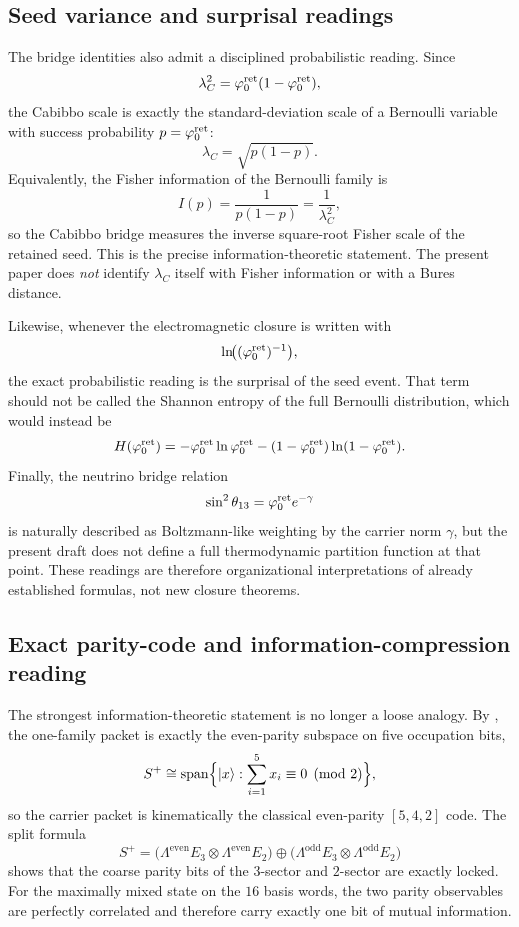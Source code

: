 \subsection{Seed variance and surprisal readings}

The bridge identities also admit a disciplined probabilistic reading. Since
\[
\lambda_C^2=\varphi_0^{\mathrm{ret}}(1-\varphi_0^{\mathrm{ret}}),
\]
the Cabibbo scale is exactly the standard-deviation scale of a Bernoulli variable with success probability $p=\varphi_0^{\mathrm{ret}}$:
\[
\lambda_C=\sqrt{p(1-p)}.
\]
Equivalently, the Fisher information of the Bernoulli family is
\[
I(p)=\frac{1}{p(1-p)}=\frac{1}{\lambda_C^2},
\]
so the Cabibbo bridge measures the inverse square-root Fisher scale of the retained seed. This is the precise information-theoretic statement. The present paper does \emph{not} identify $\lambda_C$ itself with Fisher information or with a Bures distance.

Likewise, whenever the electromagnetic closure is written with
\[
\ln\!\bigl((\varphi_0^{\mathrm{ret}})^{-1}\bigr),
\]
the exact probabilistic reading is the surprisal of the seed event. That term should not be called the Shannon entropy of the full Bernoulli distribution, which would instead be
\[
H(\varphi_0^{\mathrm{ret}})
=
-\varphi_0^{\mathrm{ret}}\ln\varphi_0^{\mathrm{ret}}-(1-\varphi_0^{\mathrm{ret}})\ln(1-\varphi_0^{\mathrm{ret}}).
\]
Finally, the neutrino bridge relation
\[
\sin^2\theta_{13}=\varphi_0^{\mathrm{ret}} e^{-\gamma}
\]
is naturally described as Boltzmann-like weighting by the carrier norm $\gamma$, but the present draft does not define a full thermodynamic partition function at that point. These readings are therefore organizational interpretations of already established formulas, not new closure theorems.

\subsection{Exact parity-code and information-compression reading}

The strongest information-theoretic statement is no longer a loose analogy. By , the one-family packet is exactly the even-parity subspace on five occupation bits,
\[
S^+
\cong
\mathrm{span}\Bigl\{|x\rangle:\sum_{i=1}^5 x_i\equiv 0 \pmod 2\Bigr\},
\]
so the carrier packet is kinematically the classical even-parity $[5,4,2]$ code. The split formula
\[
S^+
=
\bigl(\Lambda^{\mathrm{even}}E_3\otimes\Lambda^{\mathrm{even}}E_2\bigr)
\oplus
\bigl(\Lambda^{\mathrm{odd}}E_3\otimes\Lambda^{\mathrm{odd}}E_2\bigr)
\]
shows that the coarse parity bits of the $3$-sector and $2$-sector are exactly locked. For the maximally mixed state on the $16$ basis words, the two parity observables are perfectly correlated and therefore carry exactly one bit of mutual information.

